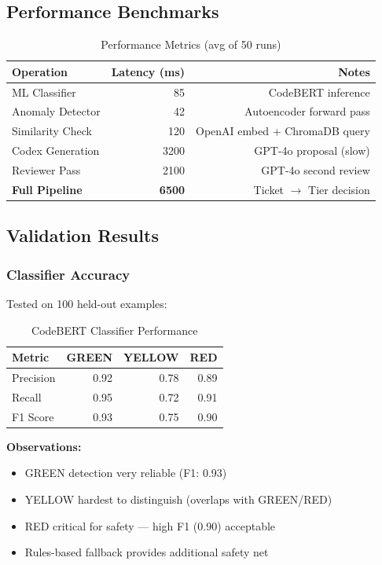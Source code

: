 \documentclass[11pt,a4paper]{article}
\begin{document}
\subsection{Performance Benchmarks}

\begin{table}[h!]
\centering
\begin{tabular}{@{}lrr@{}}
\toprule
\textbf{Operation} & \textbf{Latency (ms)} & \textbf{Notes} \\
\midrule
ML Classifier & 85 & CodeBERT inference \\
Anomaly Detector & 42 & Autoencoder forward pass \\
Similarity Check & 120 & OpenAI embed + ChromaDB query \\
Codex Generation & 3200 & GPT-4o proposal (slow) \\
Reviewer Pass & 2100 & GPT-4o second review \\
\midrule
\textbf{Full Pipeline} & \textbf{6500} & Ticket $\rightarrow$ Tier decision \\
\bottomrule
\end{tabular}
\caption{Performance Metrics (avg of 50 runs)}
\end{table}

\subsection{Validation Results}

\subsubsection{Classifier Accuracy}
Tested on 100 held-out examples:

\begin{table}[h!]
\centering
\begin{tabular}{@{}lrrr@{}}
\toprule
\textbf{Metric} & \textbf{GREEN} & \textbf{YELLOW} & \textbf{RED} \\
\midrule
Precision & 0.92 & 0.78 & 0.89 \\
Recall & 0.95 & 0.72 & 0.91 \\
F1 Score & 0.93 & 0.75 & 0.90 \\
\bottomrule
\end{tabular}
\caption{CodeBERT Classifier Performance}
\end{table}

\newpage
\textbf{Observations:}
\begin{itemize}
    \item GREEN detection very reliable (F1: 0.93)
    \item YELLOW hardest to distinguish (overlaps with GREEN/RED)
    \item RED critical for safety --- high F1 (0.90) acceptable
    \item Rules-based fallback provides additional safety net
\end{itemize}
\end{document}
